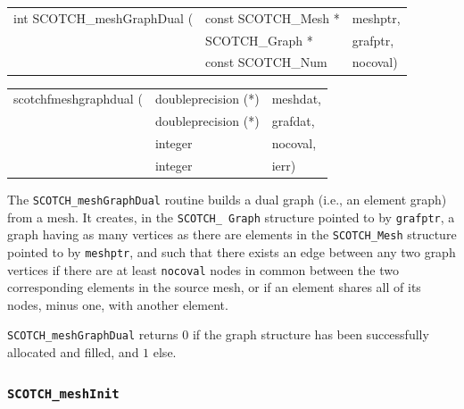 \begin{itemize}
\progsyn

{\tt\begin{tabular}{l@{}ll}
int SCOTCH\_meshGraphDual ( & const SCOTCH\_Mesh * & meshptr, \\
                            & SCOTCH\_Graph *      & grafptr, \\
                            & const SCOTCH\_Num    & nocoval)
\end{tabular}}

{\tt\begin{tabular}{l@{}ll}
scotchfmeshgraphdual ( & doubleprecision (*) & meshdat, \\
                       & doubleprecision (*) & grafdat, \\
                       & integer             & nocoval, \\
                       & integer             & ierr)
\end{tabular}}

\progdes

The {\tt SCOTCH\_meshGraphDual} routine builds a dual graph (i.e., an
element graph) from a mesh. It creates, in the {\tt SCOTCH\_\lbt
  Graph} structure pointed to by {\tt grafptr}, a graph having as many
vertices as there are elements in the {\tt SCOTCH\_\lbt Mesh}
structure pointed to by {\tt meshptr}, and such that there exists an
edge between any two graph vertices if there are at least
{\tt nocoval} nodes in common between the two corresponding elements
in the source mesh, or if an element shares all of its nodes, minus
one, with another element.

\progret

{\tt SCOTCH\_meshGraphDual} returns $0$ if the graph structure has
been successfully allocated and filled, and $1$ else.
\end{itemize}

\subsubsection{{\tt SCOTCH\_meshInit}}
\label{sec-lib-func-meshinit}

